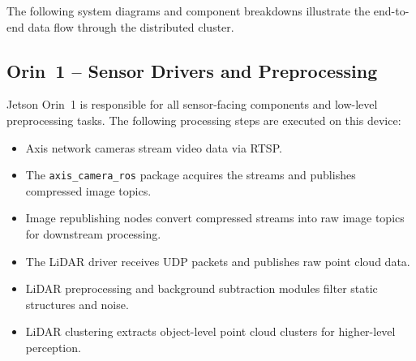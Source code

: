 \documentclass[12pt,a4paper]{report}
\begin{document}
The following system diagrams and component breakdowns illustrate the end-to-end data flow through the distributed cluster.

\subsection{Orin~1 -- Sensor Drivers and Preprocessing}
Jetson Orin~1 is responsible for all sensor-facing components and low-level preprocessing tasks. The following processing steps are executed on this device:
\begin{itemize}
    \item Axis network cameras stream video data via RTSP.
    \item The \texttt{axis\_camera\_ros} package acquires the streams and publishes compressed image topics.
    \item Image republishing nodes convert compressed streams into raw image topics for downstream processing.
    \item The LiDAR driver receives UDP packets and publishes raw point cloud data.
    \item LiDAR preprocessing and background subtraction modules filter static structures and noise.
    \item LiDAR clustering extracts object-level point cloud clusters for higher-level perception.
\end{itemize}
\end{document}
